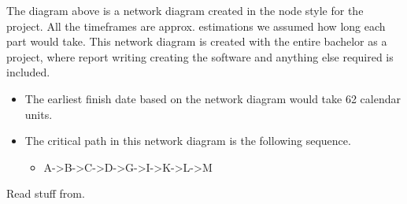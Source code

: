 The diagram above is a network diagram created in the node style for the project. All the timeframes are approx. estimations we assumed how long each part would take. This network diagram is created with the entire bachelor as a project, where report writing creating the software and anything else required is included.

\begin{itemize}
	\item The earliest finish date based on the network diagram would take 62 calendar units.
	\item The critical path in this network diagram is the following sequence.
	\begin{itemize}
		\item A->B->C->D->G->I->K->L->M
	\end{itemize}
\end{itemize}


Read stuff from\cite{Larson2021}.